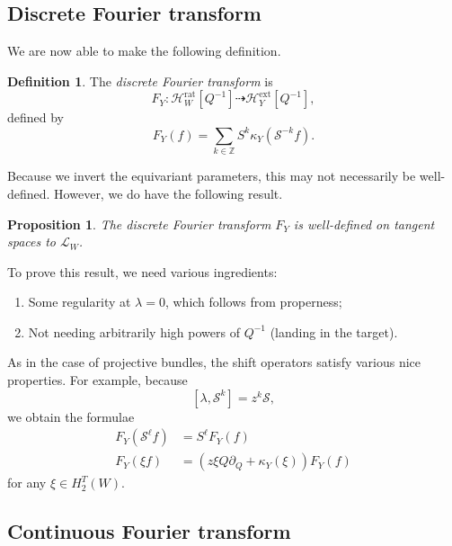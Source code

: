 \documentclass[leqno, openany]{memoir}
\newtheorem{prop}[thm]{Proposition}
\theoremstyle{definition}
\newtheorem{defn}[thm]{Definition}
\theoremstyle{remark}
\theoremstyle{plain}
\theoremstyle{definition}
\theoremstyle{remark}
\newcommand{\Z}{\mathbb{Z}}
\newcommand{\mc}[1]{\mathcal{#1}}
\newcommand{\mr}[1]{\mathrm{#1}}
\begin{document}
\subsection{Discrete Fourier transform}%
\label{sub:Discrete Fourier transform blowup}

We are now able to make the following definition.

\begin{defn}
    The \textit{discrete Fourier transform} is
    \[ F_Y \colon \mc{H}_W^{\mr{rat}}[Q^{-1}] \dashrightarrow \mc{H}_Y^{\mr{ext}}[Q^{-1}], \]
    defined by
    \[ F_Y(f) = \sum_{k \in \Z} S^k \kappa_Y (\mc{S}^{-k} f). \]
\end{defn}

Because we invert the equivariant parameters, this may not necessarily be well-defined. However, we do have the following result.

\begin{prop}
    The discrete Fourier transform $F_Y$ is well-defined on tangent spaces to $\mc{L}_W$.
\end{prop}

To prove this result, we need various ingredients:
\begin{enumerate}
    \item Some regularity at $\lambda = 0$, which follows from properness;
    \item Not needing arbitrarily high powers of $Q^{-1}$ (landing in the target).
\end{enumerate}

As in the case of projective bundles, the shift operators satisfy various nice properties. For example, because
\[ [\lambda, \mc{S}^k] = z^k \mc{S}, \]
we obtain the formulae
\begin{align*}
    F_Y(\mc{S}^{\ell} f) &= S^{\ell} F_Y(f) \\
    F_Y(\xi f) &= (z \xi Q \partial_Q + \kappa_Y(\xi)) F_Y(f)
\end{align*}
for any $\xi \in H_2^T(W)$.

\subsection{Continuous Fourier transform}%
\label{sub:Continuous Fourier transform blowup}
\end{document}
